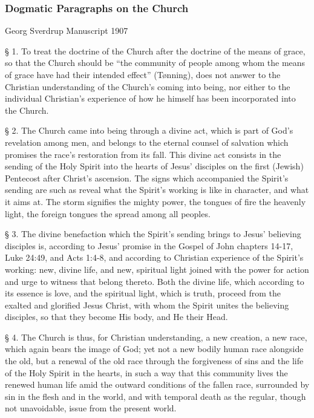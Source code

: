 
\subsubsection{Dogmatic Paragraphs on the Church}

Georg Sverdrup
Manuscript 1907

§ 1. To treat the doctrine of the Church after the doctrine of the means of grace, so that the Church should be “the community of people among whom the means of grace have had their intended effect” (Tønning), does not answer to the Christian understanding of the Church’s coming into being, nor either to the individual Christian’s experience of how he himself has been incorporated into the Church.

§ 2. The Church came into being through a divine act, which is part of God’s revelation among men, and belongs to the eternal counsel of salvation which promises the race’s restoration from its fall. This divine act consists in the sending of the Holy Spirit into the hearts of Jesus’ disciples on the first (Jewish) Pentecost after Christ’s ascension. The signs which accompanied the Spirit’s sending are such as reveal what the Spirit’s working is like in character, and what it aims at. The storm signifies the mighty power, the tongues of fire the heavenly light, the foreign tongues the spread among all peoples.

§ 3. The divine benefaction which the Spirit’s sending brings to Jesus’ believing disciples is, according to Jesus’ promise in the Gospel of John chapters 14-17, Luke 24:49, and Acts 1:4-8, and according to Christian experience of the Spirit’s working: new, divine life, and new, spiritual light joined with the power for action and urge to witness that belong thereto. Both the divine life, which according to its essence is love, and the spiritual light, which is truth, proceed from the exalted and glorified Jesus Christ, with whom the Spirit unites the believing disciples, so that they become His body, and He their Head.

§ 4. The Church is thus, for Christian understanding, a new creation, a new race, which again bears the image of God; yet not a new bodily human race alongside the old, but a renewal of the old race through the forgiveness of sins and the life of the Holy Spirit in the hearts, in such a way that this community lives the renewed human life amid the outward conditions of the fallen race, surrounded by sin in the flesh and in the world, and with temporal death as the regular, though not unavoidable, issue from the present world.

